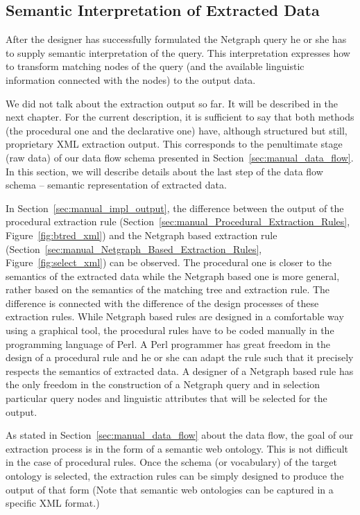\subsection{Semantic Interpretation of Extracted Data} \label{sec:manual_sem_interpret}

After the designer has successfully formulated the Netgraph query he or she has to supply semantic interpretation of the query. This interpretation expresses how to transform matching nodes of the query (and the available linguistic information connected with the nodes) to the output data.

We did not talk about the extraction output so far. It will be described in the next chapter. For the current description, it is sufficient to say that both methods (the procedural one and the declarative one) have, although structured but still, proprietary XML extraction output. This corresponds to the penultimate stage (raw data) of our data flow schema presented in Section~\ref{sec:manual_data_flow}. In this section, we will describe details about the last step of the data flow schema -- semantic representation of extracted data.

In Section~\ref{sec:manual_impl_output}, the difference between the output of the procedural extraction rule (Section~\ref{sec:manual_Procedural_Extraction_Rules}, Figure~\ref{fig:btred_xml}) and the Netgraph based extraction rule (Section~\ref{sec:manual_Netgraph_Based_Extraction_Rules}, Figure~\ref{fig:select_xml}) can be observed. The procedural one is closer to the semantics of the extracted data while the Netgraph based one is more general, rather based on the semantics of the matching tree and extraction rule. The difference is connected with the difference of the design processes of these extraction rules. While Netgraph based rules are designed in a comfortable way using a graphical tool, the procedural rules have to be coded manually in the programming language of Perl. A Perl programmer has great freedom in the design of a procedural rule and he or she can adapt the rule such that it precisely respects the semantics of extracted data. A designer of a Netgraph based rule has the only freedom in the construction of a Netgraph query and in selection particular query nodes and linguistic attributes that will be selected for the output.

As stated in Section~\ref{sec:manual_data_flow} about the data flow, the goal of our extraction process is in the form of a semantic web ontology. This is not difficult in the case of procedural rules. Once the schema (or vocabulary) of the target ontology is selected, the extraction rules can be simply designed to produce the output of that form (Note that semantic web ontologies can be captured in a specific XML format.)

